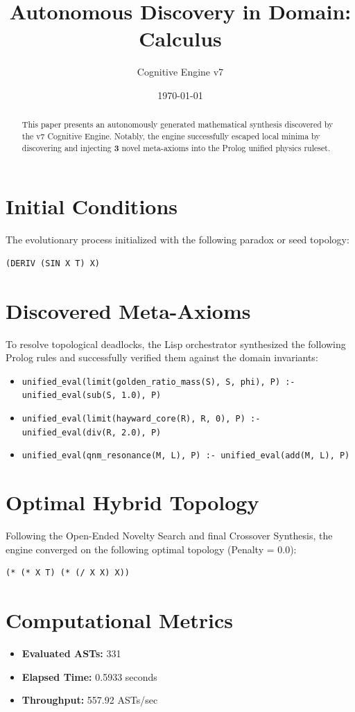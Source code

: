 \documentclass{article}
\title{Autonomous Discovery in Domain: Calculus}
\author{Cognitive Engine v7}
\date{\today}
\begin{document}
\maketitle
\begin{abstract}
This paper presents an autonomously generated mathematical synthesis discovered by the v7 Cognitive Engine. Notably, the engine successfully escaped local minima by discovering and injecting \textbf{3} novel meta-axioms into the Prolog unified physics ruleset.\end{abstract}
\section{Initial Conditions}
The evolutionary process initialized with the following paradox or seed topology:
\begin{verbatim}
(DERIV (SIN X T) X)
\end{verbatim}
\section{Discovered Meta-Axioms}
To resolve topological deadlocks, the Lisp orchestrator synthesized the following Prolog rules and successfully verified them against the domain invariants:
\begin{itemize}
  \item \texttt{unified_eval(limit(golden_ratio_mass(S), S, phi), P) :- unified_eval(sub(S, 1.0), P)}
  \item \texttt{unified_eval(limit(hayward_core(R), R, 0), P) :- unified_eval(div(R, 2.0), P)}
  \item \texttt{unified_eval(qnm_resonance(M, L), P) :- unified_eval(add(M, L), P)}
\end{itemize}
\section{Optimal Hybrid Topology}
Following the Open-Ended Novelty Search and final Crossover Synthesis, the engine converged on the following optimal topology (Penalty = 0.0):
\begin{verbatim}
(* (* X T) (* (/ X X) X))
\end{verbatim}
\section{Computational Metrics}
\begin{itemize}
  \item \textbf{Evaluated ASTs:} 331
  \item \textbf{Elapsed Time:} 0.5933 seconds
  \item \textbf{Throughput:} 557.92 ASTs/sec
\end{itemize}
\end{document}
